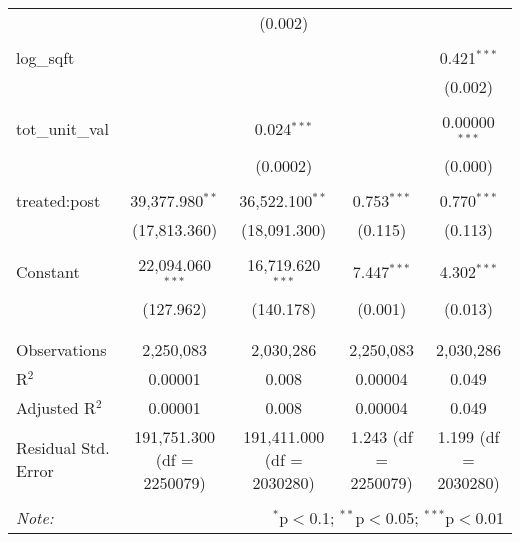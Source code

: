 \begin{table}[H]
{\begin{tabular}{@{\extracolsep{5pt}}lcccc}
   &  & (0.002) &  &  \\  

   & & & & \\  

  log\_sqft &  &  &  & 0.421$^{***}$ \\  

   &  &  &  & (0.002) \\  

   & & & & \\  

  tot\_unit\_val &  & 0.024$^{***}$ &  & 0.00000$^{***}$ \\  

   &  & (0.0002) &  & (0.000) \\  

   & & & & \\  

  treated:post & 39,377.980$^{**}$ & 36,522.100$^{**}$ & 0.753$^{***}$ & 0.770$^{***}$ \\  

   & (17,813.360) & (18,091.300) & (0.115) & (0.113) \\  

   & & & & \\  

  Constant & 22,094.060$^{***}$ & 16,719.620$^{***}$ & 7.447$^{***}$ & 4.302$^{***}$ \\  

   & (127.962) & (140.178) & (0.001) & (0.013) \\  

   & & & & \\  

 \hline \\[-1.8ex]  

 Observations & 2,250,083 & 2,030,286 & 2,250,083 & 2,030,286 \\  

 R$^{2}$ & 0.00001 & 0.008 & 0.00004 & 0.049 \\  

 Adjusted R$^{2}$ & 0.00001 & 0.008 & 0.00004 & 0.049 \\  

 Residual Std. Error & 191,751.300 (df = 2250079) & 191,411.000 (df = 2030280) & 1.243 (df = 2250079) & 1.199 (df = 2030280) \\  

 \hline  

 \hline \\[-1.8ex]  

 \textit{Note:}  & \multicolumn{4}{r}{$^{*}$p$<$0.1; $^{**}$p$<$0.05; $^{***}$p$<$0.01} \\  

 \end{tabular}}  

 \end{table}  

